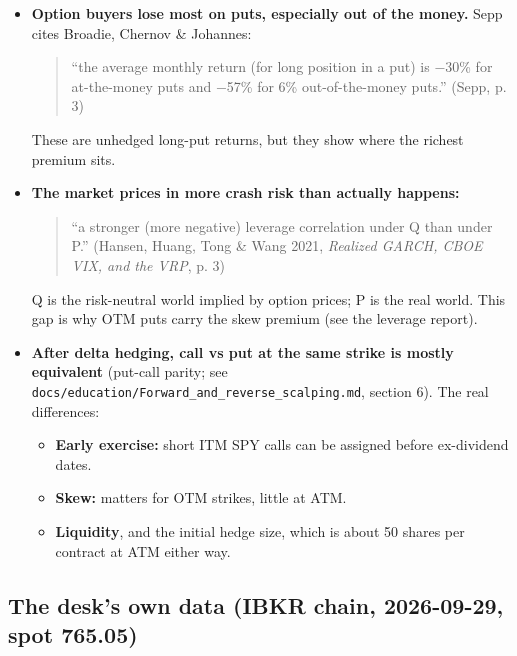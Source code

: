 \documentclass{article}
\begin{document}
\begin{itemize}

\item \textbf{Option buyers lose most on puts, especially out of the money.} Sepp cites Broadie, Chernov \& Johannes:

\begin{quote}``the average monthly return (for long position in a put) is \ensuremath{-}30\% for at-the-money puts and \ensuremath{-}57\% for 6\% out-of-the-money puts.'' (Sepp, p. 3)\end{quote}

These are unhedged long-put returns, but they show where the richest premium sits.

\item \textbf{The market prices in more crash risk than actually happens:}

\begin{quote}``a stronger (more negative) leverage correlation under Q than under P.'' (Hansen, Huang, Tong \& Wang 2021, \emph{Realized GARCH, CBOE VIX, and the VRP}, p. 3)\end{quote}

Q is the risk-neutral world implied by option prices; P is the real world. This gap is why OTM puts carry the skew premium (see the leverage report).

\item \textbf{After delta hedging, call vs put at the same strike is mostly equivalent} (put-call parity; see \texttt{docs/\allowbreak{}education/\allowbreak{}Forward\_\allowbreak{}and\_\allowbreak{}reverse\_\allowbreak{}scalping.\allowbreak{}md}, section 6). The real differences:

\begin{itemize}

\item \textbf{Early exercise:} short ITM SPY calls can be assigned before ex-dividend dates.

\item \textbf{Skew:} matters for OTM strikes, little at ATM.

\item \textbf{Liquidity}, and the initial hedge size, which is about 50 shares per contract at ATM either way.

\end{itemize}

\end{itemize}

\subsection{The desk's own data (IBKR chain, 2026-09-29, spot 765.05)}
\end{document}
